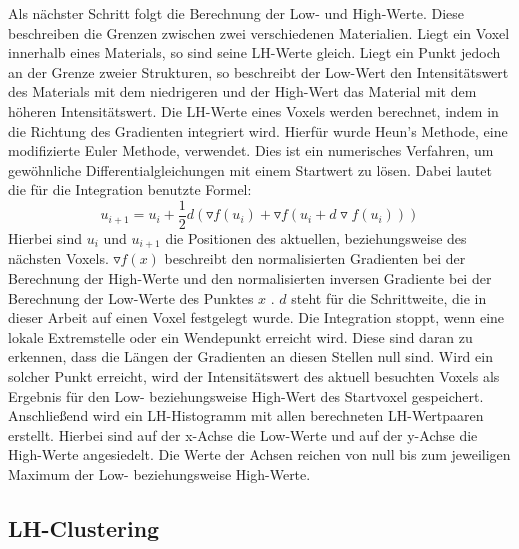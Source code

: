 Als nächster Schritt folgt die Berechnung der Low- und High-Werte. Diese beschreiben die Grenzen zwischen zwei verschiedenen Materialien. Liegt ein Voxel innerhalb eines Materials, so sind seine LH-Werte gleich. Liegt ein Punkt jedoch an der Grenze zweier Strukturen, so beschreibt der Low-Wert den Intensitätswert des Materials mit dem niedrigeren und der High-Wert das Material mit dem höheren Intensitätswert. Die LH-Werte eines Voxels werden berechnet, indem in die Richtung des Gradienten integriert wird. Hierfür wurde Heun's Methode, eine modifizierte Euler Methode, verwendet. Dies ist ein numerisches Verfahren, um gewöhnliche Differentialgleichungen mit einem Startwert zu lösen. Dabei lautet die für die Integration benutzte Formel:
\begin{equation}
	u_{i+1} = u_{i} + \frac{1}{2}d(\triangledown f (u_{i}) + \triangledown f(u_{i}+d \triangledown f(u_{i}))) 
\end{equation}
Hierbei sind $u_{i}$ und $u_{i+1}$ die Positionen des aktuellen, beziehungsweise des nächsten Voxels. $\triangledown f(x)$ beschreibt den normalisierten Gradienten bei der Berechnung der High-Werte und den normalisierten inversen Gradiente bei der Berechnung der Low-Werte des Punktes $x$ . $d$ steht für die Schrittweite, die in dieser Arbeit auf einen Voxel festgelegt wurde.
\newline
Die Integration stoppt, wenn eine lokale Extremstelle oder ein Wendepunkt erreicht wird. Diese sind daran zu erkennen, dass die Längen der Gradienten an diesen Stellen null sind. Wird ein solcher Punkt erreicht, wird der Intensitätswert des aktuell besuchten Voxels als Ergebnis für den Low- beziehungsweise High-Wert des Startvoxel gespeichert.
\newline
Anschließend wird ein LH-Histogramm mit allen berechneten LH-Wertpaaren erstellt. Hierbei sind auf der x-Achse die Low-Werte und auf der y-Achse die High-Werte angesiedelt. Die Werte der Achsen reichen von null bis zum jeweiligen Maximum der Low- beziehungsweise High-Werte.



\subsection{LH-Clustering}

